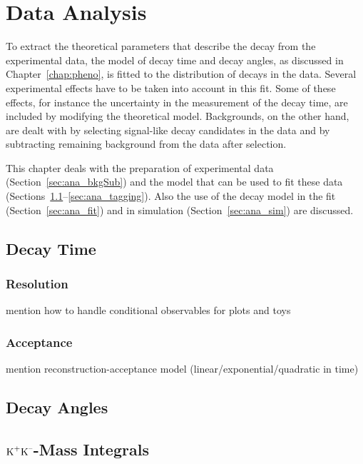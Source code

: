\chapter{Data Analysis}
\label{chap:ana}


To extract the theoretical parameters that describe the \BstoJpsiKK{} decay from the experimental data, the model of decay time and decay
angles, as discussed in Chapter~\ref{chap:pheno}, is fitted to the distribution of decays in the data. Several experimental effects have to
be taken into account in this fit. Some of these effects, for instance the uncertainty in the measurement of the decay time, are included
by modifying the theoretical model. Backgrounds, on the other hand, are dealt with by selecting signal-like decay candidates in the data
and by subtracting remaining background from the data after selection.

This chapter deals with the preparation of experimental data (Section~\ref{sec:ana_bkgSub}) and the model that can be used to fit these
data (Sections~\ref{sec:ana_time}--\ref{sec:ana_tagging}). Also the use of the decay model in the fit (Section~\ref{sec:ana_fit}) and in
simulation (Section~\ref{sec:ana_sim}) are discussed.




\section{Decay Time}
\label{sec:ana_time}

\subsection{Resolution}
\label{subsec:ana_time_res}
mention how to handle conditional observables for plots and toys

\subsection{Acceptance}
\label{subsec:ana_time_acc}
mention reconstruction-acceptance model (linear/exponential/quadratic in time)

\section{Decay Angles}
\label{sec:ana_angles}

\section{\texorpdfstring{$\text{K}^\text{+}\text{K}^\text{--}$}{KK}-Mass Integrals}
\label{sec:ana_KKIntegrals}


